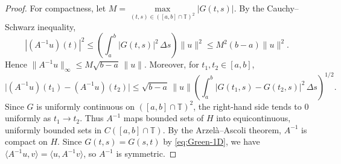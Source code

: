\documentclass[10pt,a4paper]{amsart}
\newtheorem{comment}{Comment}
\newcommand{\shalmalirmk}[1]{\textcolor{red}{\textsf{[Shalmali: #1]}}}
\begin{document}
\begin{proof}

\smallskip

For compactness, let $M=\max\limits_{(t,s)\in\left([a,b]\cap\mathbb{T}\right)^2}|G(t,s)|$. By the Cauchy--Schwarz inequality,
$$|(A^{-1}u)(t)|^2 \le \left(\int_a^b |G(t,s)|^2\,\Delta s\right)\|u\|^2 \le M^2(b-a)\|u\|^2.$$
Hence $\|A^{-1}u\|_\infty\le M\sqrt{b-a}\,\|u\|$. Moreover, for $t_1,t_2\in[a,b]$,
$$\Big|(A^{-1}u)(t_1)-(A^{-1}u)(t_2)\Big| \le \sqrt{b-a}\,\|u\| \left(\int_a^b |G(t_1,s)-G(t_2,s)|^2\,\Delta s\right)^{1/2}.$$
Since $G$ is uniformly continuous on $\left([a,b]\cap\mathbb{T}\right)^2$, the right-hand side tends to $0$ uniformly as $t_1\to t_2$. Thus $A^{-1}$ maps bounded sets of $H$ into equicontinuous, uniformly bounded sets in $C([a,b]\cap\mathbb{T})$. By the Arzel\`a--Ascoli theorem, $A^{-1}$ is compact on $H$. Since $G(t,s)=G(s,t)$ by \eqref{eq:Green-1D}, we have $\langle A^{-1}u, v\rangle = \langle u, A^{-1}v\rangle$, so $A^{-1}$ is symmetric.
\end{proof}
\end{document}
